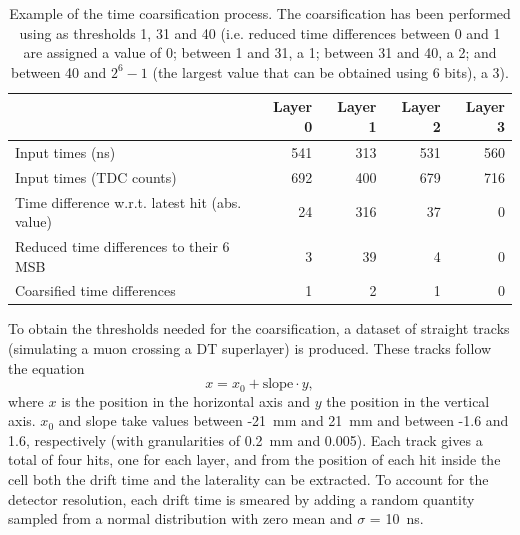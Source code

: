 \documentclass[../main.tex]{subfiles}
\begin{document}
\begin{table}[h!]
\begin{center}
\begin{small}
\begin{tabular}{l || r | r | r | r}
                                                & Layer 0 & Layer 1 & Layer 2 & Layer 3 \\\hline\hline
Input times (ns)                                & 541     & 313     & 531     & 560     \\\hline
Input times (TDC counts)                        & 692     & 400     & 679     & 716     \\\hline
Time difference w.r.t. latest hit (abs. value)  & 24      & 316     & 37      & 0       \\\hline
Reduced time differences to their 6 MSB         & 3       & 39      & 4       & 0       \\\hline
Coarsified time differences                     & 1       & 2       & 1       & 0
\end{tabular}
\end{small}
\caption[Example of the time coarsification process]{Example of the time coarsification process. The coarsification has been performed using as thresholds 1, 31 and 40 (i.e. reduced time differences between 0 and 1 are assigned a value of 0; between 1 and 31, a 1; between 31 and 40, a 2; and between 40 and $2^6 - 1$ (the largest value that can be obtained using 6 bits), a 3).}
\label{dts:tab:coarsification_example}
\end{center}

\end{table}

To obtain the thresholds needed for the coarsification, a dataset of straight tracks (simulating a muon crossing a DT superlayer) is produced. These tracks follow the equation
\begin{equation}
x = x_0 + \text{slope} \cdot y,
\end{equation}
where $x$ is the position in the horizontal axis and $y$ the position in the vertical axis. $x_0$ and slope take values between -21~mm and 21~mm and between -1.6 and 1.6, respectively (with granularities of 0.2~mm and 0.005). Each track gives a total of four hits, one for each layer, and from the position of each hit inside the cell both the drift time and the laterality can be extracted. To account for the detector resolution, each drift time is smeared by adding a random quantity sampled from a normal distribution with zero mean and $\sigma$ = 10~ns. 
\end{document}
